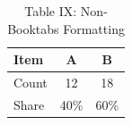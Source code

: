 \begin{table}[htbp]
\centering
\caption{Table IX: Non-Booktabs Formatting}
\begin{tabular}{|l|c|c|}
\hline
Item & A & B \\
\hline
Count & 12 & 18 \\
Share & 40\% & 60\% \\
\hline
\end{tabular}
\end{table}
